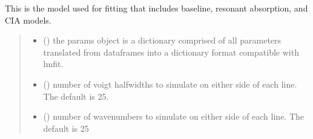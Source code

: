 \documentclass[letterpaper,10pt,english]{sphinxmanual}
\begin{document}
\begin{fulllineitems}
\begin{fulllineitems}
\begin{quote}
\begin{description}
\begin{itemize}
\end{itemize}

\end{description}\end{quote}

\end{fulllineitems}


\begin{fulllineitems}
\label{\detokenize{MATS:MATS.fit_dataset.Fit_DataSet.simulation_model}}
\pysigstartsignatures
{}
\pysigstopsignatures
\sphinxAtStartPar
This is the model used for fitting that includes baseline, resonant absorption, and CIA models.
\begin{quote}\begin{description}
\begin{itemize}
\item {} 
\sphinxAtStartPar
{} () \textendash{} the params object is a dictionary comprised of all parameters translated from dataframes into a dictionary format compatible with lmfit.

\item {} 
\sphinxAtStartPar
{} (\sphinxstyleliteralemphasis{\sphinxupquote{, }}) \textendash{} number of voigt half\sphinxhyphen{}widths to simulate on either side of each line. The default is 25.

\item {} 
\sphinxAtStartPar
{} (\sphinxstyleliteralemphasis{\sphinxupquote{, }}) \textendash{} number of wavenumbers to simulate on either side of each line. The default is 25


\end{itemize}
\end{description}
\end{quote}
\end{fulllineitems}
\end{fulllineitems}
\end{document}
